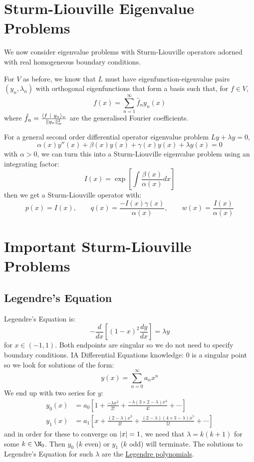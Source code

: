 \documentclass[../Main.tex]{subfiles}
\begin{document}
\section{Sturm-Liouville Eigenvalue Problems}
We now consider eigenvalue problems with Sturm-Liouville operators adorned with real homogeneous boundary conditions.

For $V$ as before, we know that $L$ must have eigenfunction-eigenvalue pairs $(y_n, \lambda_n)$ with orthogonal eigenfunctions that form a basis such that, for $f \in V$,
\begin{equation*}
    f(x) = \sum_{n = 1}^{\infty} \hat{f}_n y_n(x)
\end{equation*}
where $\hat{f}_n = \frac{\langle f~\vert~y_n\rangle_w}{\lVert y_n\rVert_w^2}$ are the generalised Fourier coefficients.

For a general second order differential operator eigenvalue problem $Ly + \lambda y = 0$,
\begin{equation*}
    \alpha(x) y''(x) + \beta(x) y(x) + \gamma(x)y(x) + \lambda y(x) = 0
\end{equation*}
with $\alpha > 0$, we can turn this into a Sturm-Liouville eigenvalue problem using an integrating factor:
\begin{equation*}
    I(x) = \exp\left[\int \frac{\beta(x)}{\alpha(x)}dx\right]
\end{equation*}
then we get a Sturm-Liouville operator with:
\begin{equation*}
    p(x) = I(x),\qquad q(x) = \frac{-I(x)\gamma(x)}{\alpha(x)},\qquad w(x) = \frac{I(x)}{\alpha(x)}
\end{equation*}
\section{Important Sturm-Liouville Problems}
\subsection{Legendre's Equation}
Legendre's Equation is:
\begin{equation*}
    -\frac{d}{dx} \left[(1 - x)^2 \frac{dy}{dx}\right] = \lambda y
\end{equation*}
for $x \in (-1, 1)$. Both endpoints are singular so we do not need to specify boundary conditions. IA Differential Equations knowledge: $0$ is a singular point so we look for solutions of the form:
\begin{equation*}
    y(x) = \sum_{n=0}^{\infty} a_n x^n
\end{equation*}
We end up with two series for $y$:
\begin{align*}
    y_0(x) &= a_0 \left[1 + \frac{-\lambda x^2}{2!} + \frac{-\lambda(3 \times 2 - \lambda)x^4}{4!} + \cdots\right] \\
    y_1(x) &= a_1 \left[x + \frac{(2 - \lambda)x^3}{3!} + \frac{(2-\lambda)(4 \times 3 - \lambda)x^5}{5!} + \cdots\right]
\end{align*}
and in order for these to converge on $\lvert x\rvert = 1$, we need that $\lambda = k(k+1)$ for some $k \in \N_0$. Then $y_0$ ($k$ even) or $y_1$ ($k$ odd) will terminate. The solutions to Legendre's Equation for such $\lambda$ are the \underline{Legendre polynomials}.
\end{document}
